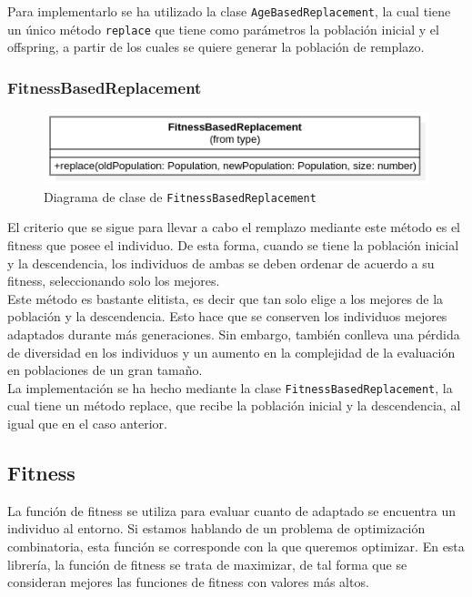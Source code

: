 Para implementarlo se ha utilizado la clase \texttt{AgeBasedReplacement}, la cual tiene un único método \texttt{replace} que tiene como parámetros la población inicial y el offspring, a partir de los cuales se quiere generar la población de remplazo.\\

\subsubsection{FitnessBasedReplacement}

\begin{figure}[ht]
    \centering
    \includegraphics[scale=0.6]{mem/images/cap-4/4.2.8(Reemplazo)/FitnessBasedReplacement.png}
    \caption{Diagrama de clase de \texttt{FitnessBasedReplacement}}
    \label{fig:my_label}
\end{figure}

El criterio que se sigue para llevar a cabo el remplazo mediante este método es el fitness que posee el individuo. De esta forma, cuando se tiene la población inicial y la descendencia, los individuos de ambas se deben ordenar de acuerdo a su fitness, seleccionando solo los mejores. \\

Este método es bastante elitista, es decir que tan solo elige a los mejores de la población y la descendencia. Esto hace que se conserven los individuos mejores adaptados durante más generaciones. Sin embargo, también conlleva una pérdida de diversidad en los individuos y un aumento en la complejidad de la evaluación en poblaciones de un gran tamaño. \\

La implementación se ha hecho mediante la clase \texttt{FitnessBasedReplacement}, la cual tiene un método replace, que recibe la población inicial y la descendencia, al igual que en el caso anterior.

\subsection{Fitness}

La función de fitness se utiliza para evaluar cuanto de adaptado se encuentra un individuo al entorno. Si estamos hablando de un problema de optimización combinatoria, esta función se corresponde con la que queremos optimizar. En esta librería, la función de fitness se trata de maximizar, de tal forma que se consideran mejores las funciones de fitness con valores más altos. \\

